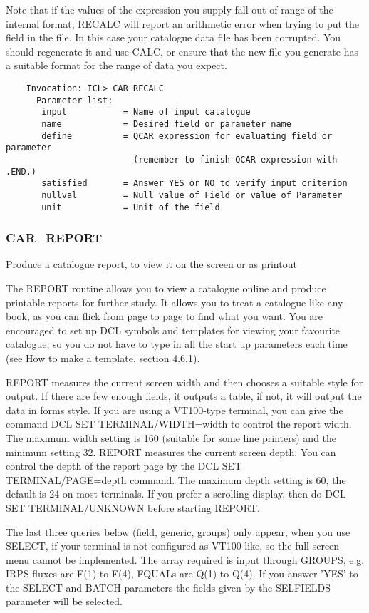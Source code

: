 Note that if the values of the expression you supply fall out of range of the
internal format, RECALC will report an arithmetic error when trying to put
the field in the file.
In this case your catalogue data file has been corrupted.
You should regenerate it and use CALC, or ensure that the new file you
generate has a suitable format for the range of data you expect.
\begin{verbatim}
    Invocation: ICL> CAR_RECALC
      Parameter list:
       input           = Name of input catalogue
       name            = Desired field or parameter name
       define          = QCAR expression for evaluating field or parameter
                         (remember to finish QCAR expression with .END.)
       satisfied       = Answer YES or NO to verify input criterion
       nullval         = Null value of Field or value of Parameter
       unit            = Unit of the field
\end{verbatim}

\subsubsection{CAR\_REPORT}

Produce a catalogue report, to view it on the screen or as printout

The REPORT routine allows you to view a catalogue online and produce
printable reports for further study.
It allows you to treat a catalogue like any book, as you can flick from
page to page to find what you want.
You are encouraged to set up DCL symbols and templates for viewing your
favourite catalogue, so you do not have to type in all the start up
parameters each time (see How to make a template, section 4.6.1).

REPORT measures the current screen width and then chooses a
suitable style for output.
If there are few enough fields, it outputs a table, if not, it will output
the data in forms style.
If you are using a VT100-type terminal, you can give the command DCL
SET TERMINAL/WIDTH=width to control the report width.
The maximum width setting is 160 (suitable for some line printers) and the
minimum setting 32.
REPORT measures the current screen depth.
You can control the depth of the report page by the DCL SET
TERMINAL/PAGE=depth command.
The maximum depth setting is 60, the default is 24 on most terminals.
If you prefer a scrolling display, then do DCL SET TERMINAL/UNKNOWN before
starting REPORT.

The last three queries below (field, generic, groups) only appear, when you use
SELECT, if your terminal is not configured as VT100-like, so the full-screen
menu cannot be implemented.
The array required is input through GROUPS, e.g. IRPS fluxes are F(1) to
F(4), FQUALs are Q(1) to Q(4).
If you answer 'YES' to the SELECT and BATCH parameters the fields given by the
SELFIELDS parameter will be selected.

